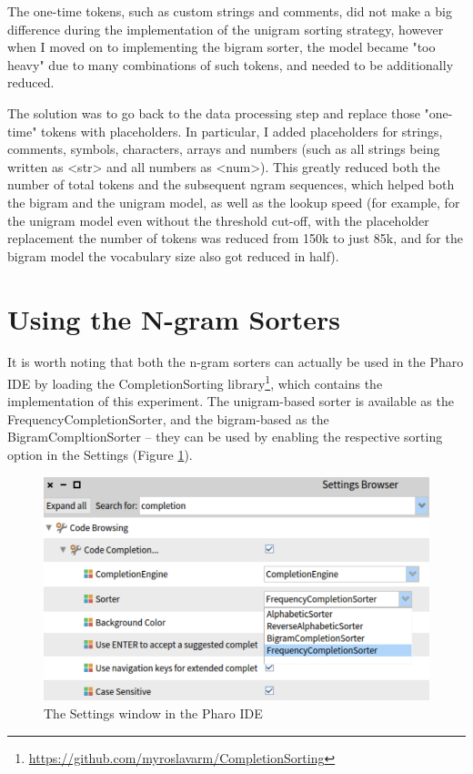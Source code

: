 The one-time tokens, such as custom strings and comments, did not make a big difference during the implementation of the unigram sorting strategy, however when I moved on to implementing the bigram sorter, the model became "too heavy" due to many combinations of such tokens, and needed to be additionally reduced.

The solution was to go back to the data processing step and replace those "one-time" tokens with placeholders. In particular, I added placeholders for strings, comments, symbols, characters, arrays and numbers (such as all strings being written as <str> and all numbers as <num>). This greatly reduced both the number of total tokens and the subsequent ngram sequences, which helped both the bigram and the unigram model, as well as the lookup speed (for example, for the unigram model even without the threshold cut-off, with the placeholder replacement the number of tokens was reduced from 150k to just 85k, and for the bigram model the vocabulary size also got reduced in half).

\section{Using the N-gram Sorters}
\label{sec:ProposedSolution-Usage}
It is worth noting that both the n-gram sorters can actually be used in the Pharo IDE by loading the CompletionSorting library\footnote{\url{https://github.com/myroslavarm/CompletionSorting}}, which contains the implementation of this experiment. The unigram-based sorter is available as the FrequencyCompletionSorter, and the bigram-based as the BigramCompltionSorter -- they can be used by enabling the respective sorting option in the Settings (Figure \ref{fig:settings}).

\begin{figure}[H]
    \centering
    \includegraphics[width=0.9\linewidth]{images/settings.png}
    \caption{The Settings window in the Pharo IDE}
    \label{fig:settings}
\end{figure}

